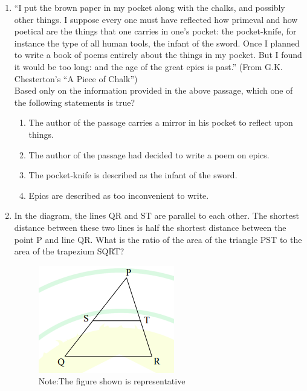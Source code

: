 \documentclass[journal,12pt,onecolumn]{IEEEtran}
\theoremstyle{remark}
\begin{document}
\begin{enumerate}
\item “I put the brown paper in my pocket along with the chalks, and possibly other things.
I suppose every one must have reflected how primeval and how poetical are the
things that one carries in one’s pocket: the pocket-knife, for instance the type of all
human tools, the infant of the sword. Once I planned to write a book of poems
entirely about the things in my pocket. But I found it would be too long: and the age
of the great epics is past.”
 \hfill(From G.K. Chesterton’s “A Piece of Chalk”)\\
 
Based only on the information provided in the above passage, which one of the
following statements is true?

\begin{enumerate}
\item The author of the passage carries a mirror in his pocket to reflect upon things.  
\item The author of the passage had decided to write a poem on epics.  
\item The pocket-knife is described as the infant of the sword.  
\item Epics are described as too inconvenient to write.  
\end{enumerate}
\hfill{}

\item In the diagram, the lines QR and ST are parallel to each other. The shortest distance
between these two lines is half the shortest distance between the point P and line
QR. What is the ratio of the area of the triangle PST to the area of the trapezium
SQRT?

\begin{figure}[H]
\centering
\includegraphics[width=0.5\columnwidth]{figs/Q-7.png}
\caption*{Note:The figure shown is representative}
\label{fig:q7}
\end{figure}

\begin{enumerate}
\end{enumerate}
\hfill{}


\end{enumerate}
\end{document}
